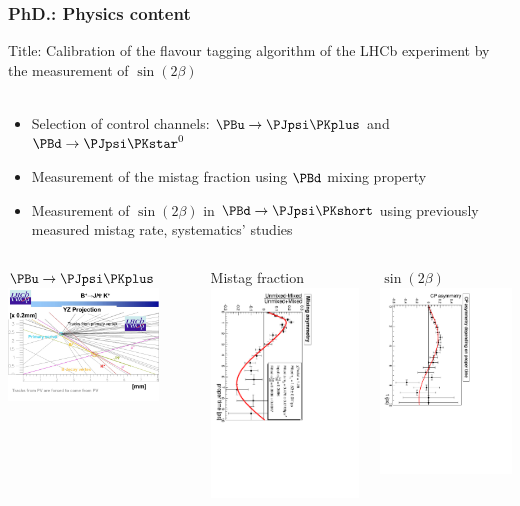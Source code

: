 \documentclass{beamer}
\begin{document}
{\begin{frame}
\frametitle{PhD.: Physics content}
Title: Calibration of the flavour tagging algorithm of the LHCb experiment by
the measurement of $\sin(2\beta)$\\
~\\
\begin{itemize}
  \item Selection of control channels: $\PBu\to\PJpsi\PKplus$ and
  $\PBd\to\PJpsi\PKstar^0$
  \item Measurement of the mistag fraction using $\PBd$ mixing property
  \item Measurement of $\sin(2\beta)$ in $\PBd\to\PJpsi\PKshort$ using
  previously measured mistag rate, systematics' studies
\end{itemize}
\begin{columns}[t]
\begin{column}[T]{4cm}
\begin{block}{$\PBu\to\PJpsi\PKplus$}
\includegraphics[width=4cm]{s7}
\end{block}
\end{column}
\begin{column}[T]{4cm}
\begin{block}{Mistag fraction}
\includegraphics[angle=90,width=4cm]{CombinedAsymFit}
\end{block}
\end{column}
\begin{column}[T]{4cm}
\begin{block}{$\sin(2\beta)$}
\includegraphics[angle=90,width=4cm]{AsymCPDC06AverageOmega}
\end{block}
\end{column}
\end{columns}
\end{frame}

}
\end{document}
